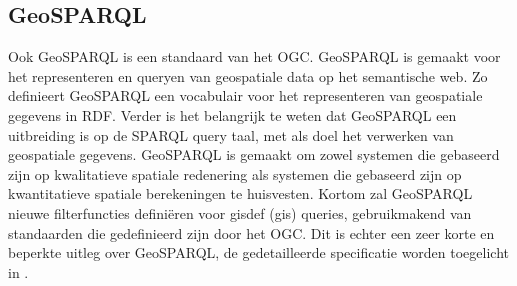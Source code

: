 \subsection{GeoSPARQL}
Ook GeoSPARQL is een standaard van het OGC. GeoSPARQL is gemaakt voor het representeren en queryen van geospatiale data op het semantische web. Zo definieert GeoSPARQL een vocabulair voor het representeren van geospatiale gegevens in RDF. Verder is het belangrijk te weten dat GeoSPARQL een uitbreiding is op de SPARQL query taal, met als doel het verwerken van geospatiale gegevens. GeoSPARQL is gemaakt om zowel systemen die gebaseerd zijn op kwalitatieve spatiale redenering als systemen die gebaseerd zijn op kwantitatieve spatiale berekeningen te huisvesten. Kortom zal GeoSPARQL nieuwe filterfuncties definiëren voor \gls{gisdef} (\acrshort{gis}) queries, gebruikmakend van standaarden die gedefinieerd zijn door het OGC. Dit is echter een zeer korte en beperkte uitleg over GeoSPARQL, de gedetailleerde specificatie worden toegelicht in .